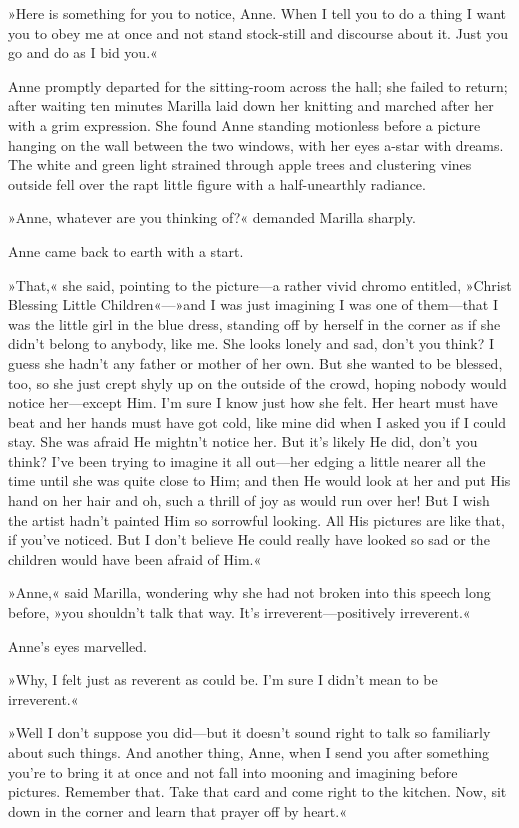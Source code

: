 »Here is something for you to notice, Anne. When I tell you to do a thing I want you to obey me at once and not stand stock-still and discourse about it. Just you go and do as I bid you.«

Anne promptly departed for the sitting-room across the hall; she failed to return; after waiting ten minutes Marilla laid down her knitting and marched after her with a grim expression. She found Anne standing motionless before a picture hanging on the wall between the two windows, with her eyes a-star with dreams. The white and green light strained through apple trees and clustering vines outside fell over the rapt little figure with a half-unearthly radiance.

»Anne, whatever are you thinking of?« demanded Marilla sharply.

Anne came back to earth with a start.

»That,« she said, pointing to the picture—a rather vivid chromo entitled, »Christ Blessing Little Children«—»and I was just imagining I was one of them—that I was the little girl in the blue dress, standing off by herself in the corner as if she didn't belong to anybody, like me. She looks lonely and sad, don't you think? I guess she hadn't any father or mother of her own. But she wanted to be blessed, too, so she just crept shyly up on the outside of the crowd, hoping nobody would notice her—except Him. I'm sure I know just how she felt. Her heart must have beat and her hands must have got cold, like mine did when I asked you if I could stay. She was afraid He mightn't notice her. But it's likely He did, don't you think? I've been trying to imagine it all out—her edging a little nearer all the time until she was quite close to Him; and then He would look at her and put His hand on her hair and oh, such a thrill of joy as would run over her! But I wish the artist hadn't painted Him so sorrowful looking. All His pictures are like that, if you've noticed. But I don't believe He could really have looked so sad or the children would have been afraid of Him.«

»Anne,« said Marilla, wondering why she had not broken into this speech long before, »you shouldn't talk that way. It's irreverent—positively irreverent.«

Anne's eyes marvelled.

»Why, I felt just as reverent as could be. I'm sure I didn't mean to be irreverent.«

»Well I don't suppose you did—but it doesn't sound right to talk so familiarly about such things. And another thing, Anne, when I send you after something you're to bring it at once and not fall into mooning and imagining before pictures. Remember that. Take that card and come right to the kitchen. Now, sit down in the corner and learn that prayer off by heart.«

